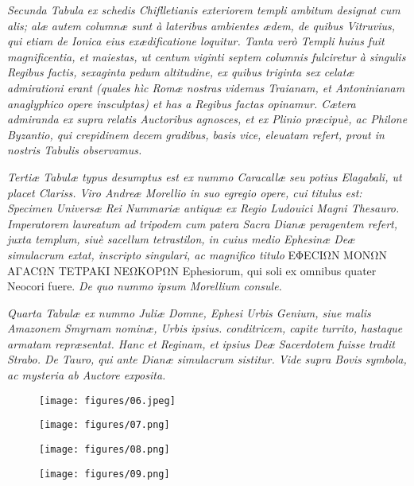 \documentclass[a4paper, 11pt, oneside, polutonikogreek, latin]{article}
\begin{document}
\emph{Secunda Tabula ex schedis Chiflletianis exteriorem templi ambitum designat cum alis; alæ autem columnæ sunt à lateribus ambientes ædem, de quibus Vitruvius, qui etiam de Ionica eius exædificatione loquitur. Tanta verò Templi huius fuit magnificentia, et maiestas, ut centum viginti septem columnis fulciretur à singulis Regibus factis, sexaginta pedum altitudine, ex quibus triginta sex celatæ admirationi erant (quales hìc Romæ nostras videmus Traianam, et Antoninianam anaglyphico opere insculptas) et has a Regibus factas opinamur. Cætera admiranda ex supra relatis Auctoribus agnosces, et ex Plinio præcipuè, ac Philone Byzantio, qui crepidinem decem gradibus, basis vice, eleuatam refert, prout in nostris Tabulis observamus.}

\emph{Tertiæ Tabulæ typus desumptus est ex nummo Caracallæ seu potius Elagabali, ut placet Clariss. Viro Andreæ Morellio in suo egregio opere, cui titulus est: Specimen Universæ Rei Nummariæ antiquæ ex Regio Ludouici Magni Thesauro. Imperatorem laureatum ad tripodem cum patera Sacra Dianæ peragentem refert, juxta templum, siuè sacellum tetrastilon, in cuius medio Ephesinæ Deæ simulacrum extat, inscripto singulari, ac magnifico titulo} EΦECIΩN MONΩN AΓACΩN TETPAKI NEΩKOPΩN Ephesiorum, qui soli ex omnibus quater Neocori fuere. \emph{De quo nummo ipsum Morellium consule.}

\emph{Quarta Tabulæ ex nummo Juliæ Domne, Ephesi Urbis Genium, siue malis Amazonem Smyrnam nominæ, Urbis ipsius. conditricem, capite turrito, hastaque armatam repræsentat. Hanc et Reginam, et ipsius Deæ Sacerdotem fuisse tradit Strabo. De Tauro, qui ante Dianæ simulacrum sistitur. Vide supra Bovis symbola, ac mysteria ab Auctore exposita.}
\clearpage
\vspace*{\fill}
\begin{figure}[H]
\centering
\texttt{[image: figures/06.jpeg]}
\end{figure}
\vspace*{\fill}
\clearpage
\vspace*{\fill}
\begin{figure}[H]
\centering
\texttt{[image: figures/07.png]}
\end{figure}
\vspace*{\fill}
\clearpage
\vspace*{\fill}
\begin{figure}[H]
\centering
\texttt{[image: figures/08.png]}
\end{figure}
\vspace*{\fill}
\clearpage
\vspace*{\fill}
\begin{figure}[H]
\centering
\texttt{[image: figures/09.png]}
\end{figure}
\vspace*{\fill}
\clearpage
\end{document}
